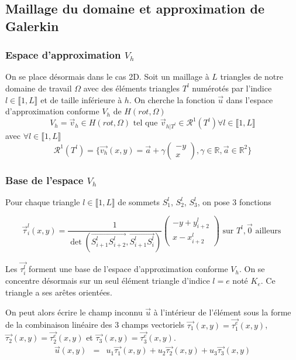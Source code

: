 \documentclass[a4paper,12pt]{article}
\begin{document}
\subsection{Maillage du domaine et approximation de Galerkin}
\subsubsection{Espace d'approximation $V_{h}$}
On se place désormais dans le cas 2D.
Soit un maillage à $L$ triangles de notre domaine de travail $\Omega$ avec des éléments triangles $T^{l}$ 
numérotés par l'indice $l \in \llbracket 1,L \rrbracket$ et de taille inférieure à $h$.
On cherche la fonction $\vec{u}$ dans l'espace d'approximation conforme $V_{h}$ de $H(rot,\Omega)$
\[
V_{h} = {{\vec{v}_{h} \in H(rot, \Omega) \text{ tel que } \vec{v}_{h|T^{l}} \in \mathcal{R}^{1}(T^{l}) \forall l \in \llbracket 1,L \rrbracket}}
\]
avec $\forall l \in \llbracket 1,L \rrbracket$
\[\mathcal{R}^{1}(T^{l}) = \{ 
\vec{v_{h}}(x,y) = \vec{a} + \gamma
\begin{pmatrix}
-y\\
x
\end{pmatrix}
, \gamma \in \mathbb{R}
, \vec{a} \in \mathbb{R}^{2} 
\}\]

\subsubsection{Base de l'espace $V_{h}$}
Pour chaque triangle $l \in \llbracket 1,L \rrbracket$ de sommets $S_{1}^{l}$, $S_{2}^{l}$, $S_{3}^{l}$, on pose 3 fonctions \cite{ref2}

\[
\vec{\tau}_{i}^{l}(x,y)=\frac{1}{\det(\vec{S_{i+1}^{l} S_{i+2}^{l}},\vec{S_{i+1}^{l} S_{i}^{l}})}
\begin{pmatrix}
-y+y_{i+2}^{l} \\
x-x_{i+2}^{l}
\end{pmatrix}
\text{ sur } T^{l},\vec{0}\text{ ailleurs }
\]

Les $\vec{\tau_{i}^{l}}$ forment une base de l'espace d'approximation conforme $V_{h}$. On se concentre désormais sur un seul élément triangle d'indice $l=e$ 
noté $K_{e}$.
Ce triangle a ses arêtes orientées.

On peut alors écrire le champ inconnu $\vec{u}$ à l'intérieur de l'élément sous la forme de la combinaison 
linéaire des 3 champs vectoriels $\vec{\tau_{1}}(x,y)=\vec{\tau_{1}^{e}}(x,y)$, $\vec{\tau_{2}}(x,y)=\vec{\tau_{2}^{e}}(x,y)$ et $\vec{\tau_{3}}(x,y)=\vec{\tau_{3}^{e}}(x,y)$.
\begin{eqnarray*}
\vec{u}(x,y) &=& u_{1} \vec{\tau_{1}}(x,y) + u_{2} \vec{\tau_{2}}(x,y) + u_{3} \vec{\tau_{3}}(x,y)
\end{eqnarray*}
\end{document}
